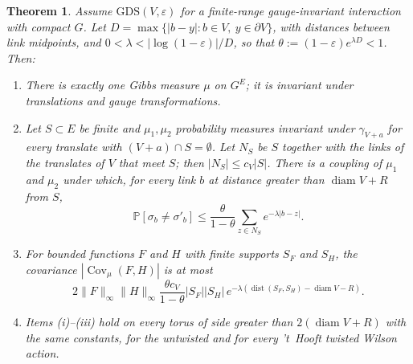 \documentclass[aps,prd,twocolumn,superscriptaddress,nofootinbib,longbibliography,floatfix,amsmath,amssymb,10pt]{revtex4-2}
\newtheorem{theorem}{Theorem}
\theoremstyle{definition}
\theoremstyle{remark}
\newcommand{\Cov}{\operatorname{Cov}}
\newcommand{\dist}{\operatorname{dist}}
\newcommand{\diam}{\operatorname{diam}}
\begin{document}
\begin{theorem}\label{thm:box}
Assume $\mathrm{GDS}(V,\varepsilon)$ for a finite-range gauge-invariant
interaction with compact $G$. Let $D=\max\{|b-y|:b\in V,\ y\in\partial V\}$,
with distances between link midpoints, and $0<\lambda<|\log(1-\varepsilon)|
/D$, so that $\theta:=(1-\varepsilon)e^{\lambda D}<1$. Then:
\begin{enumerate}[label=\textup{(\roman*)},leftmargin=*]
\item There is exactly one Gibbs measure $\mu$ on $G^E$; it is invariant
under translations and gauge transformations.
\item Let $S\subset E$ be finite and $\mu_1,\mu_2$ probability measures
invariant under $\gamma_{V+a}$ for every translate with $(V+a)\cap
S=\emptyset$. Let $N_S$ be $S$ together with the links of the translates of
$V$ that meet $S$; then $|N_S|\le c_V|S|$. There is a coupling of $\mu_1$ and
$\mu_2$ under which, for every link $b$ at distance greater than $\diam V+R$
from $S$,
\[
\mathbb P[\sigma_b\ne\sigma'_b]\le\frac{\theta}{1-\theta}\sum_{z\in N_S}
e^{-\lambda|b-z|}.
\]
\item For bounded functions $F$ and $H$ with finite supports $S_F$ and
$S_H$, the covariance $|\Cov_\mu(F,H)|$ is at most
\[
2\|F\|_\infty\|H\|_\infty\frac{\theta c_V}{1-\theta}
|S_F||S_H|\,e^{-\lambda(\dist(S_F,S_H)-\diam V-R)} .
\]
\item Items \textup{(i)--(iii)} hold on every torus of side greater than
$2(\diam V+R)$ with the same constants, for the untwisted and for every
't~Hooft twisted Wilson action.
\end{enumerate}
\end{theorem}
\end{document}
